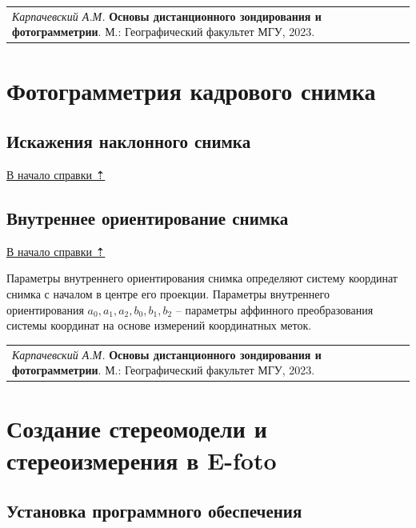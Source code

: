 \documentclass[
  12pt,
]{book}
\begin{document}
\begin{longtable}[]{@{}l@{}}
\toprule\noalign{}
\endhead
\bottomrule\noalign{}
\endlastfoot
\emph{Карпачевский А.М.} \textbf{Основы дистанционного зондирования и фотограмметрии}. М.: Географический факультет МГУ, 2023. \\
\end{longtable}

\hypertarget{photogrammetry}{%
\chapter{Фотограмметрия кадрового снимка}\label{photogrammetry}}

\hypertarget{photogrammetry-oblique}{%
\section{Искажения наклонного снимка}\label{photogrammetry-oblique}}

\protect\hyperlink{photogrammetry}{В начало справки ⇡}

\hypertarget{photogrammetry-interior}{%
\section{Внутреннее ориентирование снимка}\label{photogrammetry-interior}}

\protect\hyperlink{photogrammetry}{В начало справки ⇡}

Параметры внутреннего ориентирования снимка определяют систему координат снимка с началом в центре его проекции. Параметры внутреннего ориентирования \(a_{0}, a_{1}, a_{2}, b_{0}, b_{1}, b_{2}\) -- параметры аффинного преобразования системы координат на основе измерений координатных меток.

\begin{longtable}[]{@{}l@{}}
\toprule\noalign{}
\endhead
\bottomrule\noalign{}
\endlastfoot
\emph{Карпачевский А.М.} \textbf{Основы дистанционного зондирования и фотограмметрии}. М.: Географический факультет МГУ, 2023. \\
\end{longtable}

\hypertarget{stereo}{%
\chapter{Создание стереомодели и стереоизмерения в E-foto}\label{stereo}}

\hypertarget{stereo-soft}{%
\section{Установка программного обеспечения}\label{stereo-soft}}
\end{document}
